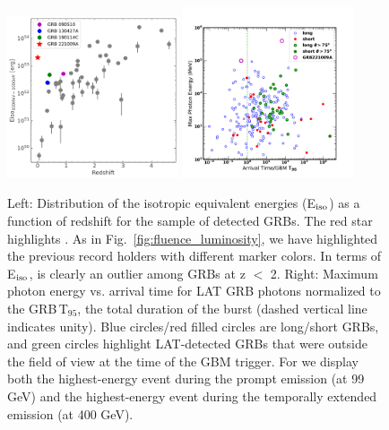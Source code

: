 \documentclass[preprint]{aastex631}
\begin{document}
\begin{figure}[t]
    \centering    
    \includegraphics[width=0.45\textwidth]{Eiso_Redshift.pdf}
    \includegraphics[width=0.45\textwidth]{ExtendedEmission_MAXE.pdf}    
    \caption{Left: Distribution of the isotropic equivalent energies (E$_{\rm iso}$) as a function of redshift for the sample of \lat detected GRBs. 
    The red star highlights \grb. 
    As in Fig.~\ref{fig:fluence_luminosity}, we have highlighted the previous record holders with different marker colors. 
    In terms of E$_{\rm iso}$, \grb is clearly an outlier among GRBs at z $<$ 2.
    Right: Maximum photon energy vs. arrival time for LAT GRB photons normalized to the GRB\,T$_{95}$, the total duration of the burst (dashed vertical line indicates unity). Blue circles/red filled circles are long/short GRBs, and green circles highlight LAT-detected GRBs that were outside the field of view at the time of the GBM trigger.
    For \grb we display both the highest-energy event during the prompt emission (at 99\,GeV) and the highest-energy event during the temporally extended emission (at 400 GeV). }
    \label{fig:emax}
\end{figure}
\end{document}

